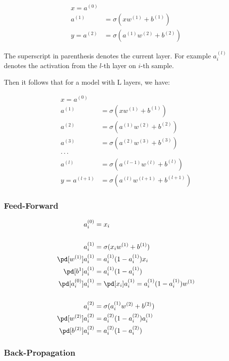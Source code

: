 \documentclass{article}
\begin{document}
\begin{align}
  x = a^{(0)} \\
  a^{(1)} &= \sigma(xw^{(1)} + b^{(1)}) \\
  y = a^{(2)} &= \sigma(a^{(1)}w^{(2)} + b^{(2)})
\end{align}

The superscript in parenthesis denotes the current layer. For example $a_i^{(l)}$ denotes the activation from the $l$-th layer on $i$-th sample.

Then it follows that for a model with L layers, we have:

\begin{align}
  x = a^{(0)} \\
  a^{(1)} &= \sigma(xw^{(1)} + b^{(1)}) \\
  a^{(2)} &= \sigma(a^{(1)}w^{(2)} + b^{(2)}) \\
  a^{(3)} &= \sigma(a^{(2)}w^{(3)} + b^{(3)}) \\
  \cdot\cdot\cdot \\
  a^{(l)} &= \sigma(a^{(l-1)}w^{(l)} + b^{(l)}) \\
  y = a^{(l + 1)} &= \sigma(a^{(l)}w^{(l+1)} + b^{(l+1)})
\end{align}


\subsubsection{Feed-Forward}

\begin{align}
  a_i^{(0)} &= x_i \\
\\
  a_i^{(1)} &= \sigma(x_iw^{(1)} + b^{(1)}) \\
  \pd[w^{(1)}]a_i^{(1)} &= a_i^{(1)}(1 - a_i^{(1)})x_i \\
  \pd[b^{1}]a_i^{(1)} &= a_i^{(1)}(1 - a_i^{(1)}) \\
  \pd[a_i^{(0)}]a_i^{(1)} &= \pd[x_i]a_i^{(1)} = a_i^{(1)}(1 - a_i^{(1)})w^{(1)} \\
\\
  a_i^{(2)} &= \sigma(a_i^{(1)}w^{(2)} + b^{(2)}) \\
  \pd[w^{(2)}]a_i^{(2)} &= a_i^{(2)}(1 - a_i^{(2)})a_i^{(1)} \\
  \pd[b^{(2)}]a_i^{(2)} &= a_i^{(2)}(1 - a_i^{(2)}) \\
\end{align}

\subsubsection{Back-Propagation}
\end{document}
